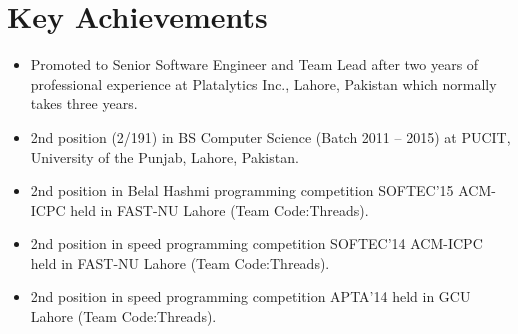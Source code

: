 \section{Key Achievements}

\begin{itemize}
    \item[\ding{118}] Promoted to Senior Software Engineer and Team Lead after two years of professional experience at Platalytics Inc., Lahore, Pakistan which normally takes three years.
    \item[\ding{118}] 2nd position (2/191) in BS Computer Science (Batch 2011 – 2015) at PUCIT, University of the Punjab, Lahore, Pakistan.
    \item[\ding{118}] 2nd position in Belal Hashmi programming competition SOFTEC’15 ACM-ICPC held in FAST-NU Lahore (Team Code:Threads).
    \item[\ding{118}] 2nd position in speed programming competition SOFTEC’14 ACM-ICPC held in FAST-NU Lahore (Team Code:Threads).
    \item[\ding{118}] 2nd position in speed programming competition APTA’14 held in GCU Lahore (Team Code:Threads).
\end{itemize}
